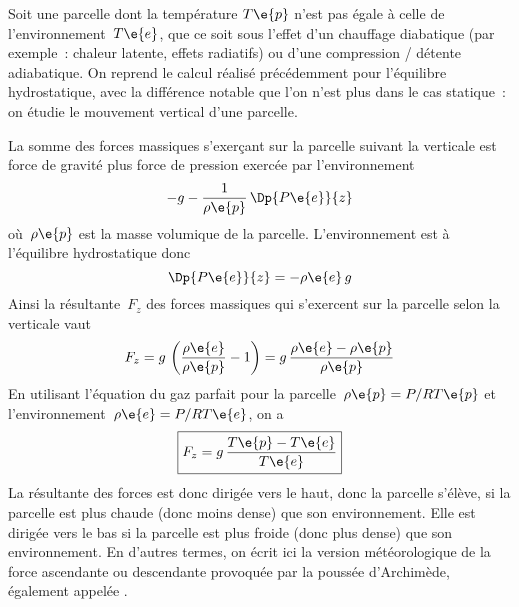 \sk
Soit une parcelle dont la température $T\e{p}$ n'est pas égale à celle de l'environnement~$T\e{e}$, que ce soit sous l'effet d'un chauffage diabatique (par exemple~: chaleur latente, effets radiatifs) ou d'une compression / détente adiabatique. On reprend le calcul réalisé précédemment pour l'équilibre hydrostatique, avec la différence notable que l'on n'est plus dans le cas statique~: on étudie le mouvement vertical d'une parcelle. 

\sk
La somme des forces massiques s'exerçant sur la parcelle suivant la verticale est force de gravité plus force de pression exercée par l'environnement
\[ - g  - \frac{1}{\rho\e{p}}  \, \Dp{P\e{e}}{z} \]
où~$\rho\e{p}$ est la masse volumique de la parcelle. L'environnement est à l'équilibre hydrostatique donc
\[ \Dp{P\e{e}}{z} = - \rho\e{e} \, g \]
Ainsi la résultante~$F_z$ des forces massiques qui s'exercent sur la parcelle selon la verticale vaut
\[ F_z = g \, \left( \frac{\rho\e{e}}{\rho\e{p}} - 1 \right) = g \, \frac{\rho\e{e}-\rho\e{p}}{\rho\e{p}} \]
En utilisant l'équation du gaz parfait pour la parcelle~$\rho\e{p}=P/RT\e{p}$ et l'environnement~$\rho\e{e}=P/RT\e{e}$, on a
\[ \boxed{ F_z = g \, \frac{T\e{p}-T\e{e}}{T\e{e}} } \]
La résultante des forces est donc dirigée vers le haut, donc la parcelle s'élève, si la parcelle est plus chaude (donc moins dense) que son environnement. 
Elle est dirigée vers le bas si la parcelle est plus froide (donc plus dense) que son environnement.
En d'autres termes, on écrit ici la version météorologique de la force ascendante ou descendante 
provoquée par la poussée d'Archimède, également appelée .


